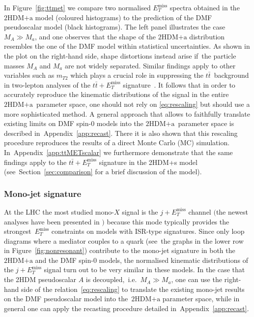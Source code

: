 \documentclass[a4paper, 11pt,notoc]{article}
\newcommand{\MET}{\ensuremath{E_T^\mathrm{miss}}\xspace}
\newcommand{\mA}{\ensuremath{M_{A}}\xspace}
\newcommand{\ma}{\ensuremath{M_{a}}\xspace}
\newcommand{\hdma}{\ensuremath{\textrm{2HDM+a}}\xspace}
\begin{document}
In Figure~\ref{fig:ttmet} we compare two normalised $\MET$ spectra obtained in the \hdma model (coloured histograms) to the prediction of the DMF pseudoscalar   model (black histograms).  The left panel illustrates the case~$M_A \gg M_a$, and one observes that the shape of the \hdma distribution resembles  the one of the DMF model within statistical uncertainties. As shown in the plot on the right-hand side, shape distortions instead arise if~the particle masses $M_A$ and $M_a$ are not widely separated.  Similar findings apply to other variables such as $m_{T2}$ which  plays a crucial role in suppressing the $t \bar t$~background in two-lepton analyses of the $t \bar t + \MET$ signature~\cite{Aaboud:2017rzf,Haisch:2016gry,CMS-PAS-EXO-17-014}. It follows that in order to accurately reproduce the kinematic distributions of the signal in the entire \hdma~parameter space, one should not rely on \eqref{eq:rescaling} but should use a more sophisticated method. A general approach  that allows to faithfully translate existing limits on DMF spin-0   models into the \hdma~parameter space  is described in~Appendix~\ref{app:recast}. There it is also shown that this rescaling procedure reproduces the results of a direct Monte Carlo (MC) simulation.  In~Appendix~\ref{app:ttMETscalar} we furthermore demonstrate that the same findings apply to the $t \bar t + \MET$ signature in the 2HDM+s model  (see~Section~\ref{sec:comparison} for a brief discussion of the model).

\subsubsection{Mono-jet signature}

At the LHC the most studied mono-$X$ signal is the $j +\MET$ channel $\big($the newest analyses have been presented in \cite{Aaboud:2017phn,Sirunyan:2017jix}$\big)$ because this mode typically provides the strongest~$\MET$ constraints on models with ISR-type  signatures. Since only loop diagrams where a mediator couples to a quark (see~the graphs in the lower row in Figure~\ref{fig:nonresonant}) contribute to the mono-jet signature in both the \hdma and the DMF spin-0 models, the normalised kinematic distributions of the $j +\MET$ signal turn out to be very similar in these models.  In the case that the 2HDM pseudoscalar $A$ is decoupled,~i.e.~$\mA \gg \ma$, one can use the right-hand side of the relation~\eqref{eq:rescaling} to translate the existing mono-jet results on the DMF pseudoscalar model into the~\hdma parameter space, while in general one can apply the recasting procedure detailed in~Appendix~\ref{app:recast}.
\end{document}
